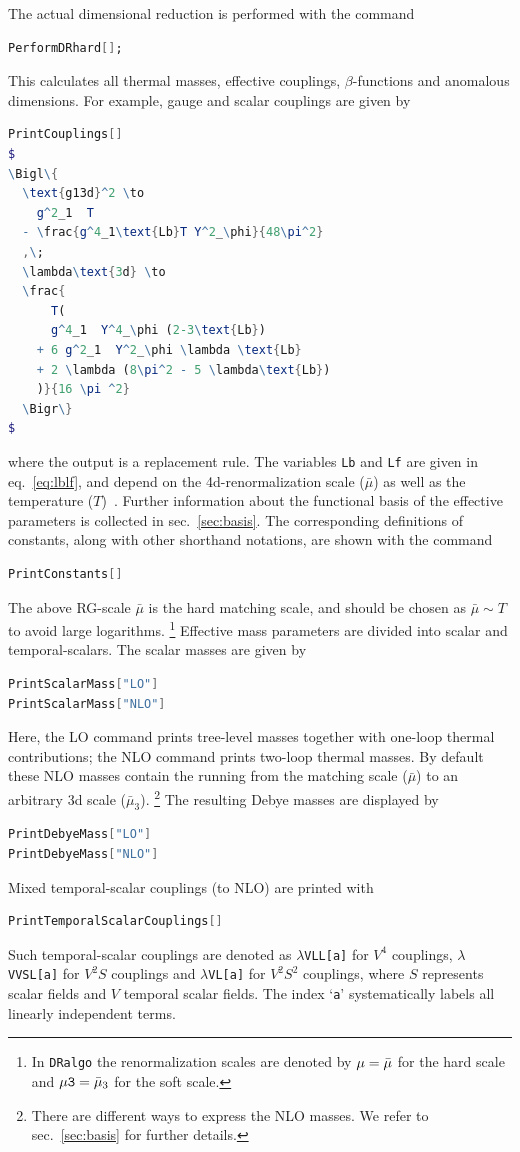 \documentclass[11pt]{article}
\def\dralgo{{\tt DRalgo}}
\newcommand{\Lamd}{\bmu_{3}}
\newcommand{\LamD}{\bmu}
\newcommand{\bmu}{\bar\mu}
\begin{document}
The actual dimensional reduction is performed with the command
\begin{lstlisting}[language=Mathematica,mathescape=true]
PerformDRhard[];
\end{lstlisting}
This calculates all
thermal masses,
effective couplings,
$\beta$-functions and
anomalous dimensions.
For example, gauge and scalar couplings are given by
\begin{lstlisting}[language=Mathematica,mathescape=true]
PrintCouplings[]
$
\Bigl\{
  \text{g13d}^2 \to
    g^2_1  T
  - \frac{g^4_1\text{Lb}T Y^2_\phi}{48\pi^2}
  ,\;
  \lambda\text{3d} \to
  \frac{
      T(
      g^4_1  Y^4_\phi (2-3\text{Lb})
    + 6 g^2_1  Y^2_\phi \lambda \text{Lb}
    + 2 \lambda (8\pi^2 - 5 \lambda\text{Lb})
    )}{16 \pi ^2}
  \Bigr\}
$
\end{lstlisting}
where
the output is a replacement rule.
The variables
{\tt Lb} and
{\tt Lf} are
given in eq.~\eqref{eq:lblf}, and
depend on
the 4d-renormalization scale ($\LamD$)
as well as
the temperature ($T$)~\cite{Kajantie:1995dw,Farakos:1994kx}.
Further information about the functional basis
of the effective parameters is collected in sec.~\ref{sec:basis}.
The corresponding definitions of constants,
along with other shorthand notations,
are shown with the command
\begin{lstlisting}[language=Mathematica,mathescape=true]
PrintConstants[]
\end{lstlisting}

The above RG-scale $\LamD$ is the hard matching scale, and should be chosen
as $\LamD \sim T$ to avoid large logarithms.%
\footnote{
  In \dralgo{} the renormalization scales are denoted by
  ${\tt \mu} = \LamD$ for the hard scale and
  ${\tt \mu 3} = \Lamd$ for the soft scale.
}
Effective mass parameters are divided into scalar and temporal-scalars.
The scalar masses are given by
\begin{lstlisting}[language=Mathematica,mathescape=true]
PrintScalarMass["LO"]
PrintScalarMass["NLO"]
\end{lstlisting}
Here,
the LO command prints tree-level masses together with one-loop thermal contributions; the NLO command prints two-loop thermal masses.
By default these NLO masses contain
the running from the matching scale ($\LamD$) to an arbitrary 3d scale ($\Lamd$).%
\footnote{
  There are different ways to express the NLO masses.
  We refer to sec.~\ref{sec:basis} for further details.
}
The resulting Debye masses are displayed by
\begin{lstlisting}[language=Mathematica,mathescape=true]
PrintDebyeMass["LO"]
PrintDebyeMass["NLO"]
\end{lstlisting}
Mixed temporal-scalar couplings (to NLO)
are printed with
\begin{lstlisting}[language=Mathematica,mathescape=true]
PrintTemporalScalarCouplings[]
\end{lstlisting}
Such temporal-scalar couplings are denoted as
$\lambda${\verb!VLL[a]!} for $V^4$ couplings,
$\lambda${\verb!VVSL[a]!} for $V^2 S$ couplings and
$\lambda${\verb!VL[a]!} for $V^2S^2$ couplings,
where
$S$ represents scalar fields and
$V$ temporal scalar fields.
The index
`{\tt a}'
systematically labels all linearly independent terms.
\end{document}
